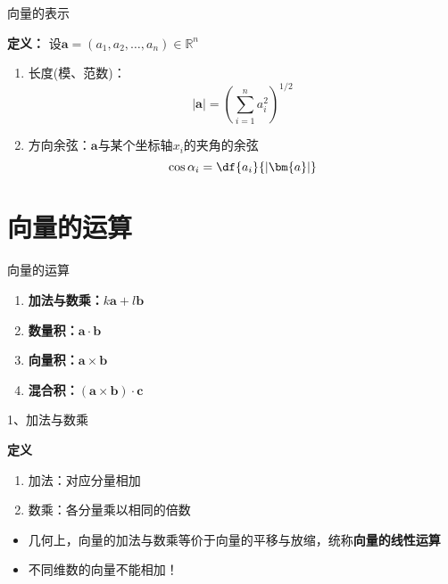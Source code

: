 \begin{frame}{向量的表示}
	\linespread{0.8}\pause 
	\begin{block}{{\bf 定义：}
	设$\bm{a}=(a_1,a_2,\ldots,a_n)\in\mathbb{R}^n$\hfill}\pause 
		\begin{enumerate}
		  \item {\bb 长度(模、范数)：}\vspace{-1ex}
		  $$|\bm{a}|=\left(\sum\limits_{i=1}^na_i^2\right)^{1/2}$$\pause 
		  \item {\bb 方向余弦：}$\bm{a}$与某个坐标轴$x_i$的夹角的余弦\pause 
		  $$\cos\alpha_i=\df{a_i}{|\bm{a}|}$$
		  
		  \pause {} 
		\end{enumerate}
	\end{block}
\end{frame}

\section{向量的运算}

\begin{frame}[<+->]{向量的运算}
	\linespread{2}
	\begin{enumerate}
	  \item {\bf 加法与数乘：}$k\bm{a}+l\bm{b}$
	  \item {\bf 数量积：}$\bm{a}\cdot\bm{b}$
	  \item {\bf 向量积：}$\bm{a}\times\bm{b}$
	  \item {\bf 混合积：}$(\bm{a}\times\bm{b})\cdot\bm{c}$
	\end{enumerate}
\end{frame}

\begin{frame}{1、加法与数乘}
	\linespread{1.2}\pause 
	\begin{block}{{\bf 定义} \hfill}
		\begin{enumerate}
		  \item {\bb 加法：}对应分量相加
		  \item {\bb 数乘：}各分量乘以相同的倍数
		\end{enumerate}
	\end{block}\pause 
	\begin{itemize}
	  \item \alert{几何上，向量的加法与数乘等价于向量的平移与放缩，\pause 统称{\bf 向量的线性运算}}\pause 
	  \item \alert{不同维数的向量不能相加！}
	\end{itemize}
\end{frame}

